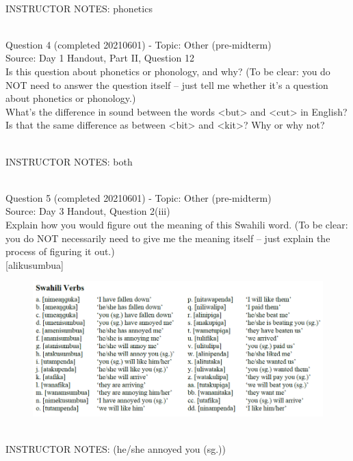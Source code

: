 \documentclass[12pt]{article}
\begin{document}
~\\
INSTRUCTOR NOTES: phonetics


~\\

{\large Question 4} (completed 20210601) - Topic: Other (pre-midterm)\\
Source: Day 1 Handout, Part II, Question 12\\

Is this question about phonetics or phonology, and why? (To be clear: you do NOT need to answer the question itself -- just tell me whether it's a question about phonetics or phonology.)\\

What’s the difference in sound between the words <but> and <cut> in English? Is that the same difference as between <bit> and <kit>? Why or why not?


~\\
INSTRUCTOR NOTES: both


~\\

{\large Question 5} (completed 20210601) - Topic: Other (pre-midterm)\\
Source: Day 3 Handout, Question 2(iii)\\

Explain how you would figure out the meaning of this Swahili word. (To be clear: you do NOT necessarily need to give me the meaning itself -- just explain the process of figuring it out.)\\

{[alikusumbua]}

\begin{figure}[H]
\includegraphics{../images/swahiliverbs.png}
\end{figure}

~\\
INSTRUCTOR NOTES: (he/she annoyed you (sg.))


~\\
\end{document}
